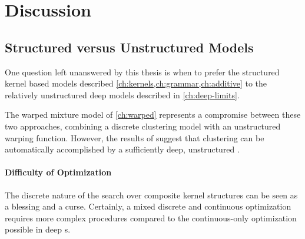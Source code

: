 
\inbpdocument

\chapter{Discussion}
\label{ch:discussion}









\section{Structured versus Unstructured \sgp{} Models}

One question left unanswered by this thesis is when to prefer the structured kernel based models described \cref{ch:kernels,ch:grammar,ch:additive} to the relatively unstructured deep \gp{} models described in \cref{ch:deep-limits}.

The warped mixture model of \cref{ch:warped} represents a compromise between these two approaches, combining a discrete clustering model with an unstructured warping function.
However, the results of \citet{damianou2012deep} suggest that clustering can be automatically accomplished by a sufficiently deep, unstructured \gp{}.

\subsubsection{Difficulty of Optimization}
The discrete nature of the search over composite kernel structures can be seen as a blessing and a curse.
Certainly, a mixed discrete and continuous optimization requires more complex procedures compared to the continuous-only optimization possible in deep \gp{}s.

